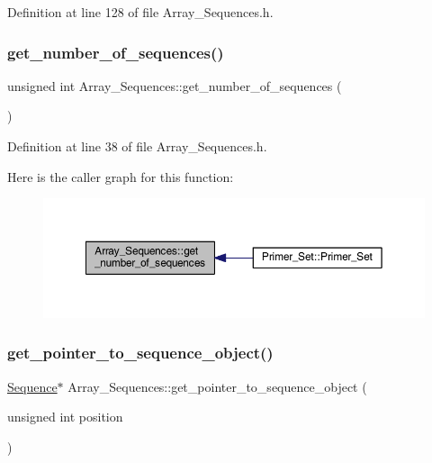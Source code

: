Definition at line 128 of file Array\+\_\+\+Sequences.\+h.

\mbox{\label{class_array___sequences_a76fd0aa59aaf720c64088ab9c900668f}} 
\subsubsection{\texorpdfstring{get\+\_\+number\+\_\+of\+\_\+sequences()}{get\_number\_of\_sequences()}}
{\footnotesize\ttfamily unsigned int Array\+\_\+\+Sequences\+::get\+\_\+number\+\_\+of\+\_\+sequences (\begin{DoxyParamCaption}{ }\end{DoxyParamCaption})\hspace{0.3cm}{\ttfamily [inline]}}



Definition at line 38 of file Array\+\_\+\+Sequences.\+h.

Here is the caller graph for this function\+:
\nopagebreak
\begin{figure}[H]
\begin{center}
\leavevmode
\includegraphics[width=350pt]{class_array___sequences_a76fd0aa59aaf720c64088ab9c900668f_icgraph}
\end{center}
\end{figure}
\mbox{\label{class_array___sequences_a029592cf35f56df0714e5326a3901b74}} 
\subsubsection{\texorpdfstring{get\+\_\+pointer\+\_\+to\+\_\+sequence\+\_\+object()}{get\_pointer\_to\_sequence\_object()}}
{\footnotesize\ttfamily \mbox{\hyperlink{class_sequence}{Sequence}}$\ast$ Array\+\_\+\+Sequences\+::get\+\_\+pointer\+\_\+to\+\_\+sequence\+\_\+object (\begin{DoxyParamCaption}\item[{unsigned int}]{position }\end{DoxyParamCaption})\hspace{0.3cm}{\ttfamily [inline]}}



